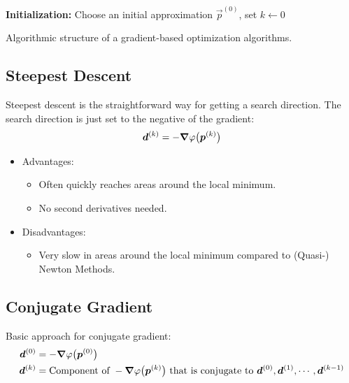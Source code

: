 				\begin{algorithm}  \DontPrintSemicolon
					\textbf{Initialization:} Choose an initial approximation \(\vec{p}^{(0)}\), set \( k \gets 0 \) \;

					\caption{Algorithmic structure of a gradient-based optimization algorithms.}
					\label{alg:gradientBasedAlgorithmStructure}
				\end{algorithm}

		\subsection{Steepest Descent}
			Steepest descent is the straightforward way for getting a search direction. The search direction is just set to the negative of the gradient:
			\begin{align*}
				\bm{d}^{(k)} = -\grad{\varphi}\big(\bm{p}^{(k)}\big)
			\end{align*}

			\begin{itemize}
				\item Advantages:
					\begin{itemize}
						\item Often quickly reaches areas around the local minimum.
						\item No second derivatives needed.
					\end{itemize}
				\item Disadvantages:
					\begin{itemize}
						\item Very slow in areas around the local minimum compared to (Quasi-) Newton Methods.
					\end{itemize}
			\end{itemize}

		\subsection{Conjugate Gradient}
			Basic approach for conjugate gradient:
			\begin{align*}
				\bm{d}^{(0)} & = -\grad{\varphi}\big(\bm{p}^{(0)}\big)                                                                                                            \\
				\bm{d}^{(k)} & = \text{Component of } -\grad{\varphi}\big(\bm{p}^{(k)}\big) \text{ that is conjugate to } \bm{d}^{(0)}, \bm{d}^{(1)}, \cdots, \bm{d}^{(k - 1)}
			\end{align*}

